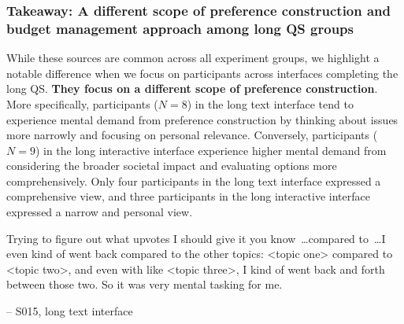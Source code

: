 \subsubsection{Takeaway: A different scope of preference construction and budget management approach among long QS groups}
\label{sec:mental_takeaway}

While these sources are common across all experiment groups, we highlight a notable difference when we focus on participants across interfaces completing the long QS. \textbf{They focus on a different scope of preference construction}. More specifically, participants ($N=8$) in the long text interface tend to experience mental demand from preference construction by thinking about issues more narrowly and focusing on personal relevance. Conversely, participants ($N=9$) in the long interactive interface experience higher mental demand from considering the broader societal impact and evaluating options more comprehensively. Only four participants in the long text interface expressed a comprehensive view, and three participants in the long interactive interface expressed a narrow and personal view.

    

\begin{displayquote}
Trying to figure out what upvotes I should give it you know~\ldots compared to~\ldots I even kind of went back compared to the other topics: <topic one> compared to <topic two>, and even with like <topic three>, I kind of went back and forth between those two. \bracketellipsis So it was very mental tasking for me.

\noindent \hfill -- S015, long text interface
\end{displayquote}

    

